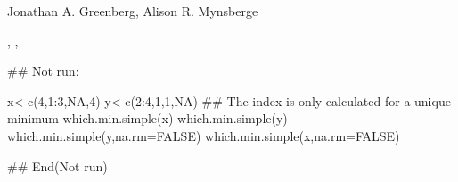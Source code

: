 \documentclass[a4paper]{book}
\begin{document}
%
\begin{Author}\relax
Jonathan A. Greenberg, Alison R. Mynsberge
\end{Author}
%
\begin{SeeAlso}\relax
{}, ,
\end{SeeAlso}
%
\begin{Examples}
\begin{ExampleCode}
## Not run: 

x<-c(4,1:3,NA,4)
y<-c(2:4,1,1,NA)
## The index is only calculated for a unique minimum
which.min.simple(x)
which.min.simple(y)
which.min.simple(y,na.rm=FALSE)
which.min.simple(x,na.rm=FALSE)

## End(Not run)
\end{ExampleCode}
\end{Examples}
\printindex{}
\end{document}
